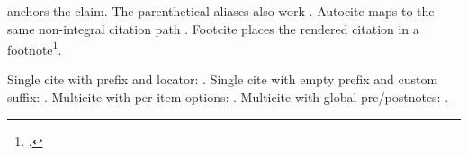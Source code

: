 \documentclass{article}
\begin{document}
\textcite{smith2020} anchors the claim.
The parenthetical aliases also work \parencite{smith2020}.
Autocite maps to the same non-integral citation path \autocite[p.~7]{smith2020}.
Footcite places the rendered citation in a footnote\footcite{smith2020}.

Single cite with prefix and locator: \cite[see][p.~12]{smith2020}.
Single cite with empty prefix and custom suffix: \cite[][(with caveats)]{smith2020}.
Multicite with per-item options: \cites[see][p.~42]{smith2020}[also][ch.~2]{smith2020}.
Multicite with global pre/postnotes: \cites(compare)(for context){smith2020}.

\printbibliography
\end{document}
